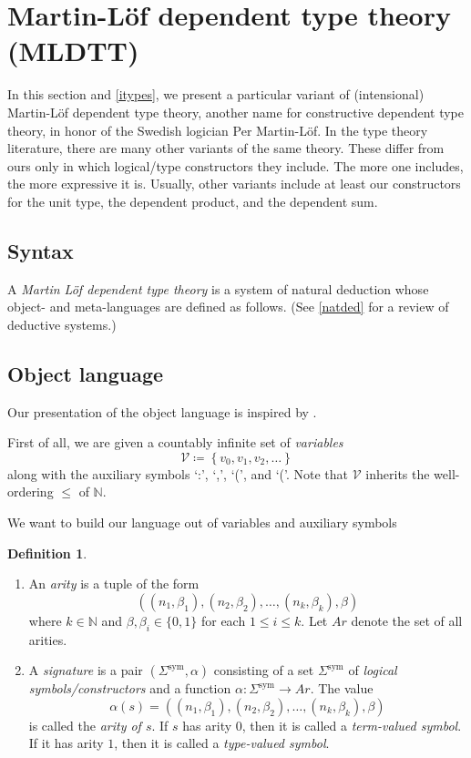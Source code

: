 \documentclass[10pt,letterpaper,cm]{nupset}
\theoremstyle{definition}
\newtheorem{definition}{Definition}[subsection]
\theoremstyle{theorem}
\theoremstyle{remark}
\DeclareMathOperator{\sym}{sym}
\newcommand{\0}{\mathbf{0}}
\newcommand{\1}{\mathbf{1}}
\newcommand{\2}{\mathbf{2}}
\newcommand{\N}{\mathbb N}
\newcommand{\be}{\begin{enumerate}}
\newcommand{\ee}{\end{enumerate}}
\begin{document}
\section{Martin-L\"of  dependent  type theory (MLDTT)}

In this section and \cref{itypes}, we present a particular variant of (intensional)  Martin-L\"of  dependent  type theory, another name for constructive dependent type theory, in honor of the Swedish logician Per Martin-L\"of. In the type theory literature, there are many other variants of the same theory. These differ from ours only in which logical/type constructors they include. The more one includes, the more expressive it is. Usually, other variants include  at least our constructors for the unit type, the dependent product, and the dependent sum.

\subsection{Syntax}

A \textit{Martin L\"of dependent type theory} is a system of natural deduction whose object- and meta-languages are defined as follows. (See \cref{natded} for a review of deductive systems.) 

\subsection*{Object language}

Our presentation of the object language is inspired by \cite{Gambino}.

\bigskip

First of all, we are given a countably infinite set of \textit{variables} $$\mathcal{V} \coloneqq \left\{v_0, v_1, v_2, \ldots \right\}$$ along with the auxiliary symbols \lq{:}\rq,  \lq{,}\rq , \lq{(}\rq, and \lq{(}\rq.  Note that $\mathcal{V} $ inherits the well-ordering $\leq$ of $\N$.

\medskip

We want to build our language out of variables and auxiliary symbols

\begin{definition}\label{sig} $ $
\be
\item An \textit{arity} is a tuple of the form $$ \left(\left(n_{1}, \beta_{1}\right),\left(n_{2}, \beta_{2}\right), \ldots,\left(n_{k}, \beta_{k}\right), \beta\right)     $$ where $k\in \N$ and $\beta, \beta_i \in \{0,1\}$ for each $1\leq i \leq k$. Let $\mathit{Ar}$ denote the set of all arities. 
\item A \textit{signature} is a pair $\left(\Sigma^{\sym}, \alpha\right)$ consisting of a set $\Sigma^{\sym}$ of \textit{logical symbols/constructors} and a function $\alpha : \Sigma^{\sym} \to \mathit{Ar}$. The value $$\alpha(s) = \left(\left(n_{1}, \beta_{1}\right),\left(n_{2}, \beta_{2}\right), \ldots,\left(n_{k}, \beta_{k}\right), \beta\right) $$ is called the \textit{arity of $s$}.  If $s$ has arity $0$, then it is called a \textit{term-valued symbol}. If it has arity $1$, then it is called a \textit{type-valued symbol}.
\ee
\end{definition}
\end{document}
